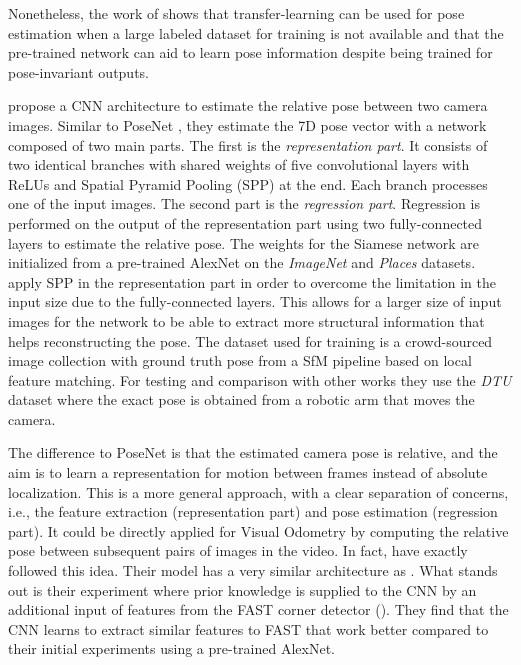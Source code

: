 			Nonetheless, the work of \citeauthor{kendall2015posenet} shows that transfer-learning can be used for pose estimation when a large labeled dataset for training is not available and that the pre-trained network can aid to learn pose information despite being trained for pose-invariant outputs.
			
		
			\cite{melekhov2017poseCNN} propose a CNN architecture to estimate the relative pose between two camera images.
			Similar to PoseNet \cite{kendall2015posenet}, they estimate the 7D pose vector with a network composed of two main parts.
			The first is the \emph{representation part}.
			It consists of two identical branches with shared weights of five convolutional layers with ReLUs and Spatial Pyramid Pooling (SPP) at the end.
			Each branch processes one of the input images.
			The second part is the \emph{regression part}.
			Regression is performed on the output of the representation part using two fully-connected layers to estimate the relative pose.
			The weights for the Siamese network are initialized from a pre-trained AlexNet on the \emph{ImageNet} and \emph{Places} datasets.
			\citeauthor{melekhov2017poseCNN} apply SPP in the representation part in order to overcome the limitation in the input size due to the fully-connected layers.
			This allows for a larger size of input images for the network to be able to extract more structural information that helps reconstructing the pose.
			The dataset used for training is a crowd-sourced image collection with ground truth pose from a SfM pipeline based on local feature matching.
			For testing and comparison with other works they use the \emph{DTU} dataset where the exact pose is obtained from a robotic arm that moves the camera.
			
			The difference to PoseNet is that the estimated camera pose is relative, and the aim is to learn a representation for motion between frames instead of absolute localization.
			This is a more general approach, with a clear separation of concerns, i.e., the feature extraction (representation part) and pose estimation (regression part).
			It could be directly applied for Visual Odometry by computing the relative pose between subsequent pairs of images in the video. 
			In fact, \cite{mohanty2016deepvo} have exactly followed this idea.
			Their model has a very similar architecture as \citeauthor{melekhov2017poseCNN}.
			What stands out is their experiment where prior knowledge is supplied to the CNN by an additional input of features from the FAST corner detector (\cite{rosten2006machine}).
			They find that the CNN learns to extract similar features to FAST that work better compared to their initial experiments using a pre-trained AlexNet.
			
